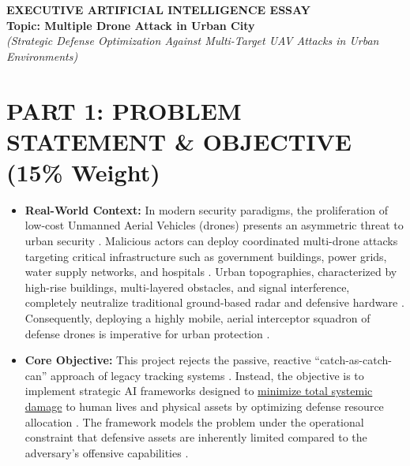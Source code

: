 \documentclass[../main.tex]{subfiles}
\begin{document}

\begin{center}
    \textbf{\LARGE EXECUTIVE ARTIFICIAL INTELLIGENCE ESSAY} \\
    \vspace{0.2cm}
    \textbf{\large Topic: Multiple Drone Attack in Urban City} \\
    \textit{(Strategic Defense Optimization Against Multi-Target UAV Attacks in Urban Environments)}
\end{center}

\vspace{0.5cm}

\section{PART 1: PROBLEM STATEMENT \& OBJECTIVE (15\% Weight)}

\begin{itemize}
    \item \textbf{Real-World Context:} In modern security paradigms, the proliferation of low-cost Unmanned Aerial Vehicles (drones) presents an asymmetric threat to urban security \cite{mutzari2025defending}. Malicious actors can deploy coordinated multi-drone attacks targeting critical infrastructure such as government buildings, power grids, water supply networks, and hospitals \cite{mutzari2025defending}. Urban topographies, characterized by high-rise buildings, multi-layered obstacles, and signal interference, completely neutralize traditional ground-based radar and defensive hardware \cite{mutzari2025defending}. Consequently, deploying a highly mobile, aerial interceptor squadron of defense drones is imperative for urban protection \cite{mutzari2025defending}.
    \item \textbf{Core Objective:} This project rejects the passive, reactive ``catch-as-catch-can'' approach of legacy tracking systems \cite{mutzari2025defending}. Instead, the objective is to implement strategic AI frameworks designed to \underline{minimize total systemic damage} to human lives and physical assets by optimizing defense resource allocation \cite{mutzari2025defending}. The framework models the problem under the operational constraint that defensive assets are inherently limited compared to the adversary's offensive capabilities \cite{mutzari2025defending}.
\end{itemize}
\end{document}

